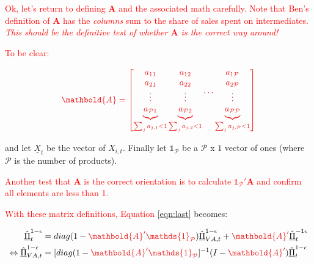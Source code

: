 \documentclass[12pt,english]{article}
\newcommand{\rlight}[1]{\textcolor{red}{#1}}
\begin{document}
\rlight{Ok, let's return to defining $\mathbold{A}$ and the associated math carefully. Note that Ben's definition of $\mathbold{A}$ has the \emph{columns} sum to the share of sales spent on intermediates. \emph{This should be the definitive test of whether $\mathbold{A}$ is the correct way around!}}

\rlight{To be clear:}

\[
	\rlight{\mathbold{A} = \begin{bmatrix}
		\underbrace{\begin{matrix} a_{11}\\ a_{21} \\ \vdots \\ a_{\mathcal{P}1}
		\end{matrix}}_{\sum_j a_{j,1} < 1}
		\underbrace{\begin{matrix} a_{12}\\ a_{22} \\ \vdots \\ a_{\mathcal{P}2}
		\end{matrix}}_{\sum_j a_{j,2} < 1}
		\dots 
		\underbrace{\begin{matrix} a_{1\mathcal{P}}\\ a_{2\mathcal{P}} \\ \vdots \\ a_{\mathcal{P}\mathcal{P}}
		\end{matrix}}_{\sum_j a_{j,\mathcal{P}} < 1}
	\end{bmatrix}}
\]


 and let $\underline{X}_t$ be the vector of $X_{i,t}$. Finally let $\mathds{1}_\mathcal{P}$ be a $\mathcal{P}$ x $1$ vector of ones (where $\mathcal{P}$ is the number of products). 
 
 \rlight{Another test that $\mathbold{A}$ is the correct orientation is to calculate $\mathds{1}_{\mathcal{P}}' \mathbold{A}$ and confirm all elements are less than 1.}
 
 
 
\rlight{ With these matrix definitions, Equation \ref{eqn:last}} becomes:

\begin{align}
	\underline{\hat{\Pi}}_{t}^{1-\epsilon} &= diag(1-\rlight{\mathbold{A}'\mathds{1}_{\mathcal{P}}})\underline{\hat{\Pi}}_{VA,t}^{1-\epsilon} + \rlight{\mathbold{A}'}\underline{\hat{\Pi}}_{t}^{-1\epsilon}\nonumber\\
	\Leftrightarrow \underline{\hat{\Pi}}_{VA,t}^{1-\epsilon} &= [diag(1-\rlight{\mathbold{A}'\mathds{1}_{\mathcal{P}}}]^{-1}(I-\rlight{\mathbold{A}'})\underline{\hat{\Pi}}_t^{1-\epsilon}\label{eqn:VA_formula}
\end{align}
\end{document}
